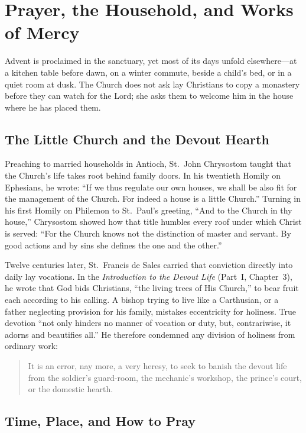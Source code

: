 \section{Prayer, the Household, and Works of Mercy}\label{sec:prayer-home}

Advent is proclaimed in the sanctuary, yet most of its days unfold elsewhere---at a kitchen table before dawn, on a winter commute, beside a child's bed, or in a quiet room at dusk. The Church does not ask lay Christians to copy a monastery before they can watch for the Lord; she asks them to welcome him in the house where he has placed them.

\subsection{The Little Church and the Devout Hearth}

Preaching to married households in Antioch, St.~John Chrysostom taught that the Church's life takes root behind family doors. In his twentieth Homily on Ephesians, he wrote: ``If we thus regulate our own houses, we shall be also fit for the management of the Church. For indeed a house is a little Church.'' Turning in his first Homily on Philemon to St.~Paul's greeting, ``And to the Church in thy house,'' Chrysostom showed how that title humbles every roof under which Christ is served: ``For the Church knows not the distinction of master and servant. By good actions and by sins she defines the one and the other.''

Twelve centuries later, St.~Francis de Sales carried that conviction directly into daily lay vocations. In the \textit{Introduction to the Devout Life} (Part~I, Chapter~3), he wrote that God bids Christians, ``the living trees of His Church,'' to bear fruit each according to his calling. A bishop trying to live like a Carthusian, or a father neglecting provision for his family, mistakes eccentricity for holiness. True devotion ``not only hinders no manner of vocation or duty, but, contrariwise, it adorns and beautifies all.'' He therefore condemned any division of holiness from ordinary work:

\begin{quote}
It is an error, nay more, a very heresy, to seek to banish the devout life from the soldier's guard-room, the mechanic's workshop, the prince's court, or the domestic hearth.
\end{quote}

\subsection{Time, Place, and How to Pray}

